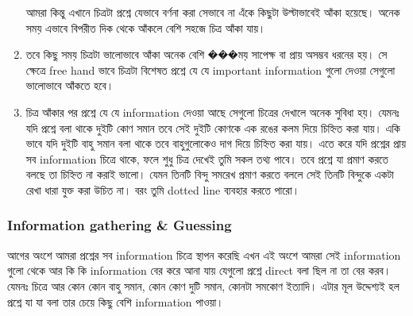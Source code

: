 \documentclass[a4paper,11pt]{article}
\begin{document}
\begin{enumerate}
\begin{figure}[ht]
\begin{minipage}{0.34\linewidth}
			\end{minipage}
		\end{figure}
		  আমরা কিন্তু এখানে চিত্রটা প্রশ্নে যেভাবে বর্ণনা করা সেভাবে না এঁকে কিছুটা উল্টাভাবেই আঁকা হয়েছে। অনেক সময় এভাবে বিপরীত দিক থেকে আঁকলে বেশি সহজে চিত্র আঁকা যায়। 
	\item তবে কিছু সময় চিত্রটা ভালোভাবে আঁকা অনেক বেশি ���ময় সাপেক্ষ বা প্রায় অসম্ভব ধরনের হয়। সে ক্ষেত্রে free hand ভাবে চিত্রটা বিশেষত প্রশ্নে যে যে important information গুলো দেওয়া সেগুলো ভালোভাবে আঁকতে হবে। 
	\item চিত্র আঁকার পর প্রশ্নে যে যে information দেওয়া আছে সেগুলো চিত্রের দেখালে অনেক সুবিধা হয়। যেমনঃ যদি প্রশ্নে বলা থাকে দুইটি কোণ সমান তবে সেই দুইটি কোণকে এক রঙের কলম দিয়ে চিহ্নিত করা যায়। একি ভাবে যদি দুইটি বাহু সমান বলা থাকে তবে বাহুগুলোকেও দাগ দিয়ে চিহ্নিত করা যায়। এতে করে যদি প্রশ্নের প্রায় সব information চিত্রে থাকে, ফলে শুধু চিত্র দেখেই তুমি সকল তথ্য পাবে। তবে প্রশ্নে যা প্রমাণ করতে বলছে তা চিহ্নিত না করাই ভালো। যেমন তিনটি বিন্দু সমরেখ প্রমাণ করতে বললে সেই তিনটি বিন্দুকে একটা রেখা ধারা যুক্ত করা উচিত না। বরং তুমি dotted line ব্যবহার করতে পারো।
\end{enumerate}
\subsubsection{Information gathering \& Guessing}
আগের অংশে আমরা প্রশ্নের সব information চিত্রে স্থাপন করেছি এখন এই অংশে আমরা সেই information গুলো থেকে আর কি কি information বের করে আনা যায় যেগুলো প্রশ্নে direct বলা ছিল না তা বের করব। যেমনঃ চিত্রে আর কোন কোন বাহু সমান, কোন কোণ দুটি সমান, কোনটা সমকোণ ইত্যাদি। এটার মূল উদ্দেশ্যই হল প্রশ্নে যা যা বলা তার চেয়ে কিছু বেশি information পাওয়া। 
\end{document}

